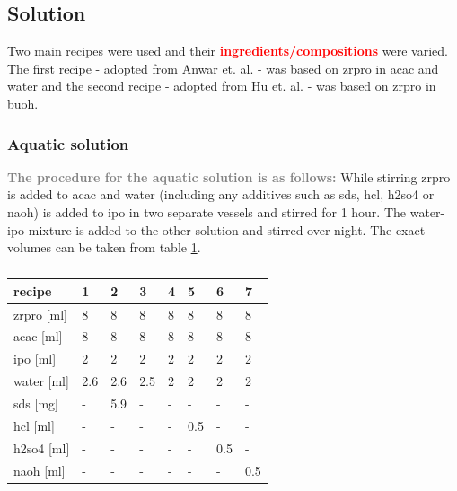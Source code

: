 \documentclass[a4paper]{article}
\newcommand{\td}[1]{\textbf{\textcolor{red}{#1}}}
\newcommand{\me}[1]{\textbf{\textcolor{gray}{#1}}}
\begin{document}
\subsection{Solution}
Two main recipes were used and their \td{ingredients/compositions} were varied. 
The first recipe - adopted from Anwar et. al. \cite{Anwar2017} - was based on \gls{zrpro} in \gls{acac} and \gls{water} 
and the second recipe - 
adopted from Hu et. al. \cite{Hu2016} -
was based on \gls{zrpro} in \gls{buoh}.
\subsubsection{Aquatic solution}
\me{The procedure for the aquatic solution is as follows:}
While stirring \gls{zrpro} is added to \gls{acac} and \gls{water} (including any additives such as \gls{sds}, \gls{hcl}, \gls{h2so4} or \gls{naoh}) is added to \gls{ipo} in two separate vessels and stirred for 1 hour. 
The \gls{water}-\gls{ipo} mixture is added to the other solution and stirred over night. 
The exact volumes can be taken from table \ref{tab:rec1}.
\begin{table}[h]
	\centering
	\caption{}
	\label{tab:rec1}
	\begin{tabular}{llllllll}
		\hline
		recipe				&1		&2		&3		&4		&5		&6		&7\\
		\hline
		\gls{zrpro} [ml]	&8		&8		&8		&8		&8		&8		&8\\
		\gls{acac} [ml]		&8		&8		&8		&8		&8		&8		&8\\
		\gls{ipo} [ml]		&2		&2		&2		&2		&2		&2		&2\\
		\gls{water} [ml]		&2.6	&2.6	&2.5	&2		&2		&2		&2\\
		\gls{sds} [mg]		&-		&5.9	&-		&-		&-		&-		&-\\
		\gls{hcl} [ml]		&-		&-		&-		&-		&0.5	&-		&-\\
		\gls{h2so4} [ml]	&-		&-		&-		&-		&-		&0.5	&-\\
		\gls{naoh} [ml] 	&-		&-		&-		&-		&-		&-		&0.5\\
		\hline
	\end{tabular}
\end{table}
%
\end{document}
